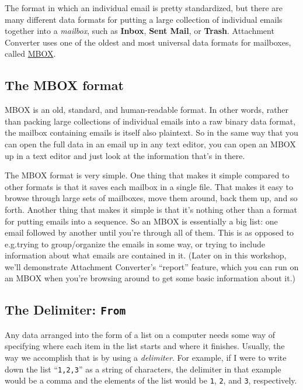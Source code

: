 \documentclass[11pt]{article}
\begin{document}
The format in which an individual email is pretty standardized, but
there are many different data formats for putting a large collection
of individual emails together into a \emph{mailbox}, such as \textbf{Inbox}, \textbf{Sent
Mail}, or \textbf{Trash}.  Attachment Converter uses one of the oldest and
most universal data formats for mailboxes, called \href{https://www.loc.gov/preservation/digital/formats/fdd/fdd000383.shtml}{MBOX}.  

\subsection{The MBOX format}
\label{sec:org1cd5526}

MBOX is an old, standard, and human-readable format.  In other words,
rather than packing large collections of individual emails into a raw
binary data format, the mailbox containing emails is itself also
plaintext.  So in the same way that you can open the full data in an
email up in any text editor, you can open an MBOX up in a text editor
and just look at the information that's in there.

The MBOX format is very simple.  One thing that makes it simple
compared to other formats is that it saves each mailbox in a single
file.  That makes it easy to browse through large sets of mailboxes,
move them around, back them up, and so forth.  Another thing that
makes it simple is that it's nothing other than a format for putting
emails into a sequence.  So an MBOX is essentially a big list: one
email followed by another until you're through all of them.  This is
as opposed to e.g.\@  trying to group/organize the emails in some way, or
trying to include information about what emails are contained in it.
(Later on in this workshop, we'll demonstrate Attachment Converter's
``report'' feature, which you can run on an MBOX when you're browsing
around to get some basic information about it.)

\subsection{The Delimiter: \texttt{From}}
\label{sec:org2ae1a54}

Any data arranged into the form of a list on a computer needs some way
of specifying where each item in the list starts and where it
finishes.  Usually, the way we accomplish that is by using a
\emph{delimiter}.  For example, if I were to write down the list ``\texttt{1,2,3}''
as a string of characters, the delimiter in that example would be a
comma and the elements of the list would be \texttt{1}, \texttt{2}, and \texttt{3},
respectively.
\end{document}
